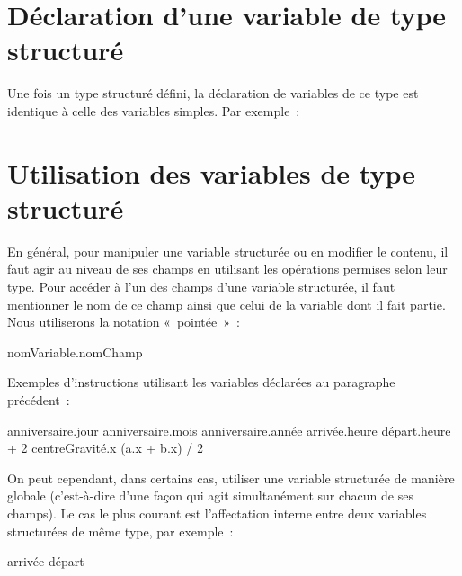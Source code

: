 	\section{Déclaration d’une variable de type structuré}
	
		Une fois un type structuré défini, 
		la déclaration de variables de ce type 
		est identique à celle des variables simples. 
		Par exemple~:
	
		\begin{LDA}
		\end{LDA}
	
	\section{Utilisation des variables de type structuré}
	
		En général, 
		pour manipuler une variable structurée ou en modifier le contenu, 
		il faut agir au niveau de ses champs en utilisant 
		les opérations permises selon leur type. 
		Pour accéder à l’un des champs d’une variable structurée, 
		il faut mentionner le nom de ce champ 
		ainsi que celui de la variable dont il fait partie.
		Nous utiliserons la notation «~pointée~»~:
	
		\begin{LDA}
		\Stmt nomVariable.nomChamp
		\end{LDA}
	
		Exemples d’instructions utilisant les variables
		déclarées au paragraphe précédent~:
	
		\begin{LDA}
		\Let anniversaire.jour \Gets 15
		\Let anniversaire.mois \Gets 10
		\Let anniversaire.année \Gets 2014
		\Let arrivée.heure \Gets départ.heure + 2
		\Let centreGravité.x \Gets (a.x + b.x) / 2
		\end{LDA}
	
		On peut cependant, dans certains cas, 
		utiliser une variable structurée de manière globale 
		(c’est-à-dire d’une façon qui agit simultanément sur chacun de ses champs). 
		Le cas le plus courant est l’affectation interne 
		entre deux variables structurées de même type, 
		par exemple~:
	
		\begin{LDA}
		\Let arrivée \Gets départ
		\end{LDA}
	
